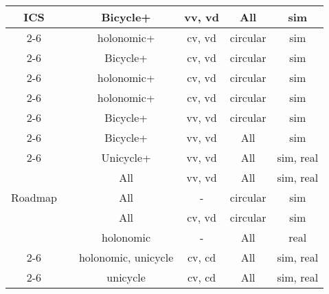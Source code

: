 \begin{table}[htpb]
\begin{tabular}{|c|c||c|c|c|c|}
        \multirow{9}{*}{ICS}&\cite{petti2005safe}  & Bicycle+ & vv, vd & All & sim \\\cmidrule{2-6}
                            &\cite{martinez2009collision}  & holonomic+ & cv, vd & circular & sim \\\cmidrule{2-6}
                            &\cite{martinez2008efficient}  & Bicycle+ & cv, vd & circular & sim \\\cmidrule{2-6}
                            &\cite{gal2009efficient}  & holonomic+ & cv, vd & circular & sim \\\cmidrule{2-6}
                            &\cite{shiller2010nonlinear}  & holonomic+ & cv, vd & circular & sim \\\cmidrule{2-6}
                            &\cite{althoff2012safety}  & Bicycle+ & vv, vd & circular & sim \\\cmidrule{2-6}
                            &\cite{bouraine2012provably} & Bicycle+ & vv, vd & All & sim \\\cmidrule{2-6}
                            &\cite{hernandez2015application}  & Unicycle+ & vv, vd & All & sim, real \\\midrule
        \multirow{3}{*}{Roadmap} &\cite{hsu2002randomized}  & All & vv, vd & All & sim, real \\\cmidrule{2-6}
                            &\cite{van2005roadmap}  & All & \-- & circular & sim \\\cmidrule{2-6}
                            &\cite{van2006anytime}  & All & cv, vd & circular & sim \\\midrule
                            &\cite{minguez2004nearness}  & holonomic & \-- & All & real \\\cmidrule{2-6}
                            &\cite{ge2002dynamic}  & holonomic, unicycle & cv, cd & All & sim, real \\\cmidrule{2-6}
                            &\cite{savkin2013simple}  & unicycle & cv, cd & All & sim, real \\\midrule
    \end{tabular}
\end{table}

